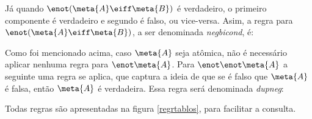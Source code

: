 Já quando  $\enot(\meta{A} \eiff \meta{B})$ é verdadeiro, o primeiro componente é verdadeiro e segundo é falso, ou vice-versa.
Asim, a regra para $\enot(\meta{A} \eiff \meta{B})$, a ser denominada \emph{negbicond}, é:


Como foi mencionado acima, caso $\meta{A}$ seja atômica, não é necessário aplicar nenhuma regra para $\enot\meta{A}$.
Para $\enot \enot \meta{A}$ a seguinte uma regra se aplica, que captura a ideia de que se é falso que $\meta{A}$ é falsa, então $\meta{A}$ é verdadeira.
Essa regra será denominada \emph{dupneg}:


Todas regras são apresentadas na figura \ref{regrtablos}, para facilitar a consulta.

